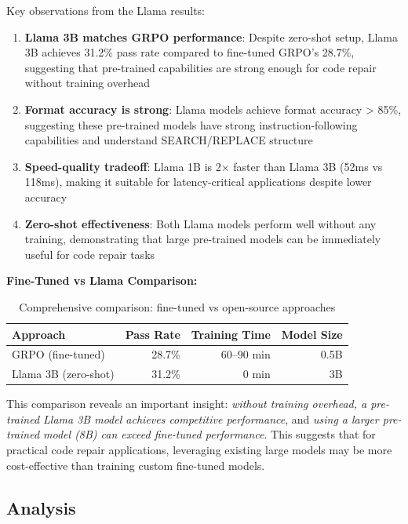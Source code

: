 \documentclass{article} %
\begin{document}
Key observations from the Llama results:
\begin{enumerate}
    \item \textbf{Llama 3B matches GRPO performance}: Despite zero-shot setup, Llama 3B achieves 31.2\% pass rate compared to fine-tuned GRPO's 28.7\%, suggesting that pre-trained capabilities are strong enough for code repair without training overhead
    \item \textbf{Format accuracy is strong}: Llama models achieve format accuracy > 85\%, suggesting these pre-trained models have strong instruction-following capabilities and understand SEARCH/REPLACE structure
    \item \textbf{Speed-quality tradeoff}: Llama 1B is 2× faster than Llama 3B (52ms vs 118ms), making it suitable for latency-critical applications despite lower accuracy
    \item \textbf{Zero-shot effectiveness}: Both Llama models perform well without any training, demonstrating that large pre-trained models can be immediately useful for code repair tasks
\end{enumerate}

\noindent\textbf{Fine-Tuned vs Llama Comparison:}

\begin{table}[t]
\caption{Comprehensive comparison: fine-tuned vs open-source approaches}
\label{tab:comparison}
\begin{center}
\begin{tabular}{lrrr}
\hline
\textbf{Approach} & \textbf{Pass Rate} & \textbf{Training Time} & \textbf{Model Size} \\
\hline
GRPO (fine-tuned) & 28.7\% & 60--90 min & 0.5B \\
Llama 3B (zero-shot) & 31.2\% & 0 min & 3B \\
\hline
\end{tabular}
\end{center}
\end{table}

This comparison reveals an important insight: \emph{without training overhead, a pre-trained Llama 3B model achieves competitive performance}, and \emph{using a larger pre-trained model (8B) can exceed fine-tuned performance}. This suggests that for practical code repair applications, leveraging existing large models may be more cost-effective than training custom fine-tuned models.

\subsection{Analysis}
\end{document}
